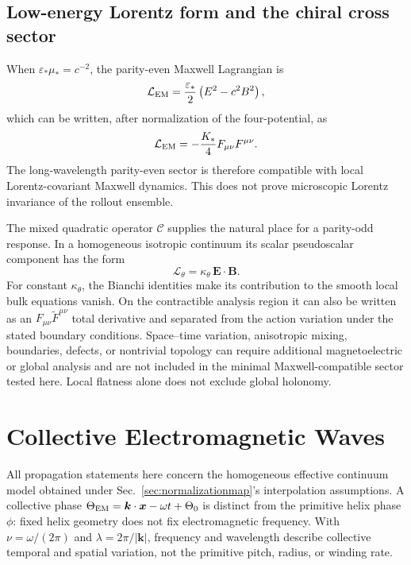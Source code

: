 \documentclass[11pt]{article}
\begin{document}
\subsection{Low-energy Lorentz form and the chiral cross sector}

When $\varepsilon_*\mu_*=c^{-2}$, the parity-even Maxwell Lagrangian is
\begin{equation}
\mathcal L_{\rm EM}
=
\frac{\varepsilon_*}{2}
\left(E^2-c^2B^2\right),
\end{equation}
which can be written, after normalization of the four-potential, as
\begin{equation}
\mathcal L_{\rm EM}
=
-\frac{K_*}{4}
F_{\mu\nu}F^{\mu\nu}.
\end{equation}
The long-wavelength parity-even sector is therefore compatible with local Lorentz-covariant Maxwell dynamics. This does not prove microscopic Lorentz invariance of the rollout ensemble.

The mixed quadratic operator $\mathcal C$ supplies the natural place for a parity-odd response. In a homogeneous isotropic continuum its scalar pseudoscalar component has the form
\begin{equation}
\mathcal L_\theta
=
\kappa_\theta\,\mathbf E\cdot\mathbf B.
\end{equation}
For constant $\kappa_\theta$, the Bianchi identities make its contribution to the smooth local bulk equations vanish. On the contractible analysis region it can also be written as an $F_{\mu\nu}\widetilde F^{\mu\nu}$ total derivative and separated from the action variation under the stated boundary conditions. Space--time variation, anisotropic mixing, boundaries, defects, or nontrivial topology can require additional magnetoelectric or global analysis and are not included in the minimal Maxwell-compatible sector tested here. Local flatness alone does not exclude global holonomy.

\section{Collective Electromagnetic Waves}

All propagation statements here concern the homogeneous effective continuum model obtained under Sec.~\ref{sec:normalizationmap}'s interpolation assumptions. A collective phase $\Theta_{\rm EM}=\bm k\cdot\bm x-\omega t+\Theta_0$ is distinct from the primitive helix phase $\phi$: fixed helix geometry does not fix electromagnetic frequency. With $\nu=\omega/(2\pi)$ and $\lambda=2\pi/|\bm k|$, frequency and wavelength describe collective temporal and spatial variation, not the primitive pitch, radius, or winding rate.
\end{document}
